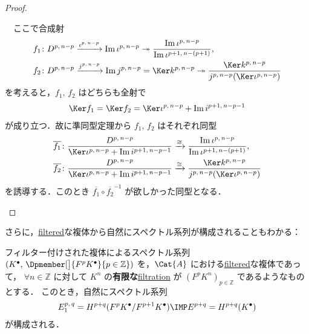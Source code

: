 \documentclass[algtopo_main]{subfiles}
\begin{document}
\begin{proof}
\begin{description}
        　ここで合成射
        \begin{align}
            f_1 &\colon D^{p,\, n-p} \xrightarrow{\iota^{p,\, n-p}} \Im \iota^{p,\, n-p} \twoheadrightarrow\frac{ \Im \iota^{p,\, n-p}}{\Im \iota^{p+1,\, n-(p+1)}}, \\
            f_2 &\colon D^{p,\, n-p} \xrightarrow{j^{p,\, n-p}} \Im j^{p,\, n-p} = \Ker k^{p,\, n-p} \twoheadrightarrow\frac{ \Ker k^{p,\, n-p}}{j^{p,\, n-p}(\Ker \iota^{p,\, n-p})}
        \end{align}
        を考えると，$f_1,\, f_2$ はどちらも全射で
        \begin{align}
            \Ker f_1 = \Ker f_2 = \Ker \iota^{p,\, n-p} + \Im i^{p+1,\, n-p-1}
        \end{align}
        が成り立つ．故に準同型定理から $f_1,\, f_2$ はそれぞれ同型
        \begin{align}
            \overline{f_1} &\colon \frac{D^{p,\, n-p}}{\Ker \iota^{p,\, n-p} + \Im i^{p+1,\, n-p-1}} \xrightarrow{\cong} \frac{ \Im \iota^{p,\, n-p}}{\Im \iota^{p+1,\, n-(p+1)}}, \\
            \overline{f_2} &\colon \frac{D^{p,\, n-p}}{\Ker \iota^{p,\, n-p} + \Im i^{p+1,\, n-p-1}} \xrightarrow{\cong} \frac{ \Ker k^{p,\, n-p}}{j^{p,\, n-p}(\Ker \iota^{p,\, n-p})}
        \end{align}
        を誘導する．このとき $\overline{f_1} \circ \overline{f_2}^{-1}$ が欲しかった同型となる．
    \end{description}
\end{proof}

さらに，\hyperref[def:filtration]{filtered}な複体から自然にスペクトル系列が構成されることもわかる：

\begin{mytheo}[label=thm:SSQ-FC-basic]{フィルター付けされた複体によるスペクトル系列}
    $(K^\bullet,\, \Dpmember[\big]{F^p K^\bullet}{p \in \mathbb{Z}})$ を，$\Cat{A}$ における\hyperref[def:filtration]{filtered}な複体であって，
    $\forall n\in \mathbb{Z}$ に対して $K^n$ の\textbf{有限な}\hyperref[def:filtration]{filtration} が $(F^p K^n)_{p \in \mathbb{Z}}$ であるようなものとする．
    このとき，自然にスペクトル系列
    \begin{align}
        E_1^{p,\, q} = H^{p+q} (F^p K^\bullet/ F^{p+1} K^\bullet) \IMP E^{p+q} = H^{p+q}(K^\bullet)
    \end{align}
    が構成される．
\end{mytheo}
\end{document}
